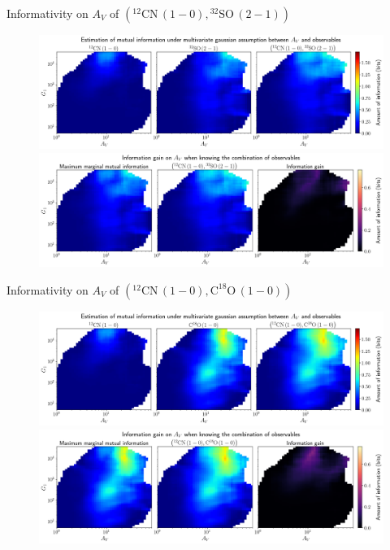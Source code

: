 \documentclass{beamer}
\begin{document}
\begin{frame}{Informativity on $A_V$ of $\left(\mathrm{^{12}CN\,(1-0)},\mathrm{^{32}SO\,(2-1)}\right)$}
    \begin{figure}
        \centering
        \includegraphics[width=0.95\linewidth]{../linearinfo/av__12cn10_32so21_linearinfo.png}
        \vfill
        \includegraphics[width=0.95\linewidth]{../linearinfo/av__12cn10_32so21_linearinfo_gain.png}
    \end{figure}
\end{frame}

\begin{frame}{Informativity on $A_V$ of $\left(\mathrm{^{12}CN\,(1-0)},\mathrm{C^{18}O\,(1-0)}\right)$}
    \begin{figure}
        \centering
        \includegraphics[width=0.95\linewidth]{../linearinfo/av__12cn10_c18o10_linearinfo.png}
        \vfill
        \includegraphics[width=0.95\linewidth]{../linearinfo/av__12cn10_c18o10_linearinfo_gain.png}
    \end{figure}
\end{frame}
\end{document}
